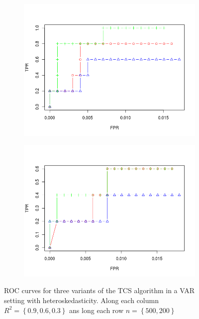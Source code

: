 \documentclass[11pt]{report}\usepackage[utf8]{inputenc}
\begin{document}
\begin{figure}[h]
\begin{subfigure}[b]{0.3\textwidth}
        \includegraphics[width=\textwidth]{../plots/200AR06}
        \caption{}
    \end{subfigure}
    \begin{subfigure}[b]{0.3\textwidth}
        \includegraphics[width=\textwidth]{../plots/200AR03}
        \caption{}
    \end{subfigure}
    \caption{ROC curves for three variants of the TCS algorithm in a VAR setting with heteroskedasticity. Along each column $R^2 = \left \{ 0.9,0.6,0.3 \right \}$ ans long each row $n = \left \{ 500, 200 \right \}$}
    \label{testing A8 fig}
\end{figure}
\end{document}
